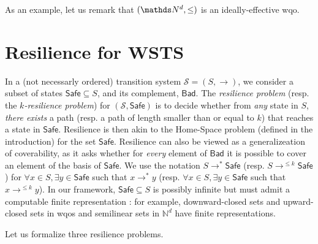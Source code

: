 \documentclass[runningheads]{llncs}
\newcommand{\problemx}[3]{
	\vspace{0.2cm}
\par\noindent\underline{\sc#1}\par\nobreak\vskip.2\baselineskip
\begingroup\clubpenalty10000\widowpenalty10000
\setbox0\hbox{\bf INPUT:\ }\setbox1\hbox{\bf QUESTION:\ }
\dimen0=\wd0\ifnum\wd1>\dimen0\dimen0=\wd1\fi
\vskip-\parskip\noindent
\hbox to\dimen0{\box0\hfil}\hangindent\dimen0\hangafter1\ignorespaces#2\par
\vskip-\parskip\noindent
\hbox to\dimen0{\box1\hfil}\hangindent\dimen0\hangafter1\ignorespaces#3\par
\endgroup
	\vspace{-0.2cm}
}
\newcommand{\Bad}{\textsf{Bad}}
\newcommand{\Safe}{\textsf{Safe}}
\begin{document}
As an example, let us remark that $(\N^d,\leq)$ is an ideally-effective wqo.


\section{Resilience for WSTS}



In a (not necessarly ordered) transition system $\mathscr{S}=(S,\rightarrow)$, we consider a subset of states $\Safe \subseteq S$, and its complement, $\Bad$.
The \emph{resilience problem} (resp. the \emph{$k$-resilience problem}) for $(\mathscr{S},\Safe)$ is to decide whether from \emph{any} state in 
$S$, \emph{there exists} a path (resp. a path of length smaller than or equal to $k$) that reaches a state in $\Safe$. Resilience is then akin to the Home-Space problem (defined in the introduction) for the set $\Safe$. Resilience can also be viewed as a generalizeation
 of coverability, as
it asks whether for \emph{every} element of $\Bad$ it is possible to cover an element of the basis of $\Safe$.
We use the notation 
$S \longrightarrow^{*} \Safe$ (resp. $S \longrightarrow^{\leq k} \Safe$)
 for 
$\forall x \in S, \exists y \in \Safe$ 
 such that $x \longrightarrow^{*} y$ 
  (resp.  $\forall x \in S, \exists y \in \Safe$ such that $x \longrightarrow^{\leq k} y$).
  In our framework, $\Safe \subseteq S$  is possibly infinite but  must admit a computable finite representation : for example, downward-closed sets and upward-closed sets in wqos and semilinear sets in $\mathbb{N}^d$ have finite representations. 





Let us formalize three resilience problems.

\end{document}

